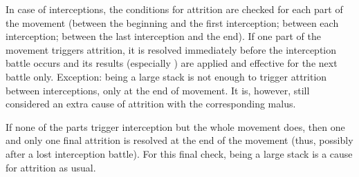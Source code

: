 In case of interceptions, the conditions for attrition are checked for each
part of the movement (between the beginning and the first interception;
between each interception; between the last interception and the end). If one
part of the movement triggers attrition, it is resolved immediately before the
interception battle occurs and its results (especially ) are
applied and effective for the next battle only. Exception: being a large stack
is not enough to trigger attrition between interceptions, only at the end of
movement. It is, however, still considered an extra cause of attrition with
the corresponding malus.

If none of the parts trigger interception but the whole movement does, then
one and only one final attrition is resolved at the end of the movement (thus,
possibly after a lost interception battle). For this final check, being a
large stack is a cause for attrition as usual.

